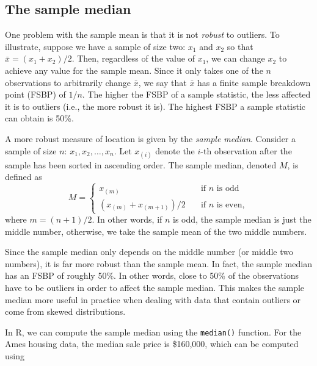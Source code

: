 \documentclass[]{book}
\newenvironment{Shaded}{\begin{snugshade}}{\end{snugshade}}
\newcommand{\CommentTok}[1]{\textcolor[rgb]{0.56,0.35,0.01}{\textit{#1}}}
\newcommand{\KeywordTok}[1]{\textcolor[rgb]{0.13,0.29,0.53}{\textbf{#1}}}
\newcommand{\NormalTok}[1]{#1}
\newcommand{\OperatorTok}[1]{\textcolor[rgb]{0.81,0.36,0.00}{\textbf{#1}}}
\theoremstyle{definition}
\theoremstyle{definition}
\theoremstyle{definition}
\theoremstyle{remark}
\begin{document}
\hypertarget{the-sample-median}{%
\subsection{The sample median}\label{the-sample-median}}

One problem with the sample mean is that it is not \emph{robust} to
outliers. To illustrate, suppose we have a sample of size two: \(x_1\)
and \(x_2\) so that \(\bar{x} = \left(x_1 + x_2\right) / 2\). Then,
regardless of the value of \(x_1\), we can change \(x_2\) to achieve any
value for the sample mean. Since it only takes one of the \(n\)
observations to arbitrarily change \(\bar{x}\), we say that \(\bar{x}\)
has a finite sample breakdown point (FSBP) of \(1 / n\). The higher the
FSBP of a sample statistic, the less affected it is to outliers (i.e.,
the more robust it is). The highest FSBP a sample statistic can obtain
is 50\%.

A more robust measure of location is given by the \emph{sample median}.
Consider a sample of size \(n\): \(x_1, x_2, \dots, x_n\). Let
\(x_{\left(i\right)}\) denote the \(i\)-th observation after the sample
has been sorted in ascending order. The sample median, denoted \(M\), is
defined as \begin{equation*}
  M = 
  \begin{cases}
    x_{\left(m\right)} & \quad \text{if } n \text{ is odd}\\
    \left(x_{\left(m\right)} + x_{\left(m + 1\right)}\right) / 2 & \quad \text{if } n \text{ is even},
  \end{cases}
\end{equation*} where \(m = \left(n + 1\right) / 2\). In other words, if
\(n\) is odd, the sample median is just the middle number, otherwise, we
take the sample mean of the two middle numbers.

Since the sample median only depends on the middle number (or middle two
numbers), it is far more robust than the sample mean. In fact, the
sample median has an FSBP of roughly 50\%. In other words, close to 50\%
of the observations have to be outliers in order to affect the sample
median. This makes the sample median more useful in practice when
dealing with data that contain outliers or come from skewed
distributions.

In R, we can compute the sample median using the \texttt{median()}
function. For the Ames housing data, the median sale price is \$160,000,
which can be computed using

\begin{Shaded}
\end{Shaded}
\end{document}
